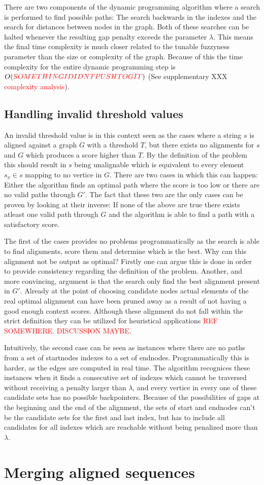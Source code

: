 \documentclass{article}
\begin{document}
\par\noindent
There are two components of the dynamic programming algorithm where a search is performed to find possible paths: The search backwards in the indexes and the search for distances between nodes in the graph. Both of these searches can be halted whenever the resulting gap penalty exceeds the parameter $\lambda$. This means the final time complexity is much closer related to the tunable fuzzyness parameter than the size or complexity of the graph. Because of this the time complexity for the entire dynamic programming step is $O(\textcolor{red}{SOMETHING I DIDNT PUSH TO GIT})$ (See supplementary XXX \textcolor{red}{complexity analysis}).
\subsection{Handling invalid threshold values}
An invalid threshold value is in this context seen as the cases where a string $s$ is aligned against a graph $G$ with a threshold $T$, but there exists no alignments for $s$ and $G$ which produces a score higher than $T$. By the definition of the problem this should result in $s$ being unalignable which is equivalent to every element $s_x \in s$ mapping to no vertice in $G$. There are two cases in which this can happen: Either the algorithm finds an optimal path where the score is too low or there are no valid paths through $G'$. The fact that these two are the only cases can be proven by looking at their inverse: If none of the above are true there exists atleast one valid path through $G$ and the algorithm is able to find a path with a satisfactory score.\\
\par\noindent
The first of the cases provides no problems programmatically as the search is able to find alignments, score them and determine which is the best. Why can this alignment not be output as optimal? Firstly one can argue this is done in order to provide consistency regarding the definition of the problem. Another, and more convincing, argument is that the search only find the best alignment present in $G'$. Already at the point of choosing candidate nodes actual elements of the real optimal alignment can have been pruned away as a result of not having a good enough context scores. Although these alignment do not fall within the strict definition they can be utilized for heuristical applications \textcolor{red}{REF SOMEWHERE. DISCUSSION MAYBE}.\\
\par\noindent
Intuitively, the second case can be seen as instances where there are no paths from a set of startnodes indexes to a set of endnodes. Programmatically this is harder, as the edges are computed in real time. The algorithm recognices these instances when it finds a consecutive set of indexes which cannot be traversed without receiving a penalty larger than $\lambda$, and every vertice in every one of these candidate sets has no possible backpointers. Because of the possibilities of gaps at the beginning and the end of the alignment, the sets of start and endnodes can't be the candidate sets for the first and last index, but has to include all candidates for all indexes which are reachable without being penalized more than $\lambda$.
\section{Merging aligned sequences}
\end{document}
